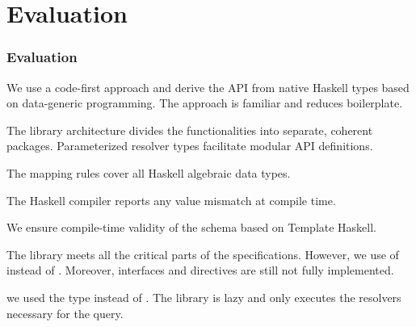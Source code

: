 \section{Evaluation}

\begin{frame}[allowframebreaks]\frametitle{Evaluation}


\begin{itemize}
  \begin{itemize}
  
     We use a code-first approach and derive the API from native Haskell types based on data-generic programming. The approach is familiar and reduces boilerplate.

    The library architecture divides the functionalities into separate, coherent packages. Parameterized resolver types facilitate modular API definitions.

  \end{itemize}
  \begin{itemize}
      \begin{enumerate}
  
         The mapping rules cover all Haskell algebraic data types.
  
         The Haskell compiler reports any value mismatch at compile time.
        
         We ensure compile-time validity of the schema based on Template Haskell. 
      
      \end{enumerate}
  
     The library meets all the critical parts of the specifications. However, we use of  instead of . Moreover, interfaces and directives are still not fully implemented. 
  
  \end{itemize}

   we used the type  instead of . The library is lazy and only executes the resolvers necessary for the query. 

\end{itemize}
\end{frame}

